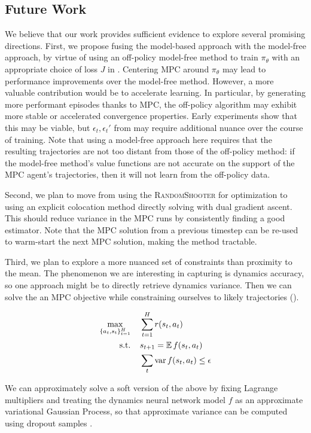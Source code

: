 \documentclass{article}
\begin{document}
\subsection{Future Work}
We believe that our work provides sufficient evidence to explore several promising directions.
%
First, we propose fusing the model-based approach with the model-free approach, by virtue of using an off-policy model-free method to train $\pi_\theta$ with an appropriate choice of loss $J$ in . Centering MPC around $\pi_\theta$ may lead to performance improvements over the model-free method. However, a more valuable contribution would be to accelerate learning. In particular, by generating more performant episodes thanks to MPC, the off-policy algorithm may exhibit more stable or accelerated convergence properties. Early experiments show that this may be viable, but $\epsilon_t,\epsilon_t'$ from  may require additional nuance over the course of training. Note that using a model-free approach here requires that the resulting trajectories are not too distant from those of the off-policy method: if the model-free method's value functions are not accurate on the support of the MPC agent's trajectories, then it will not learn from the off-policy data.

Second, we plan to move from using the \textsc{RandomShooter} for optimization to using an explicit colocation method directly solving  with dual gradient ascent. This should reduce variance in the MPC runs by consistently finding a good estimator. Note that the MPC solution from a previous timestep can be re-used to warm-start the next MPC solution, making the method tractable.

Third, we plan to explore a more nuanced set of constraints than proximity to the mean. The phenomenon we are interesting in capturing is dynamics accuracy, so one approach might be to directly retrieve dynamics variance. Then we can solve the an MPC objective while constraining ourselves to likely trajectories ().

\begin{align}
    \max_{\{a_t,s_t\}_{t=1}^H}&\;\;\;\; \sum_{t=1}^H r(s_t, a_t) \label{eq:likely}\\
    \text{s.t.} &\;\;\;\; s_{t+1} = \operatorname{\mathbb{E}} f(s_t,a_t)\nonumber\\
    & \;\;\;\;\sum_t\operatorname{var} f(s_t,a_t)\le \epsilon\nonumber
\end{align}

We can approximately solve a soft version of the above by fixing Lagrange multipliers and treating the dynamics neural network model $f$ as an approximate variational Gaussian Process, so that approximate variance can be computed using dropout samples \cite{gal2016dropout}.




\end{document}
